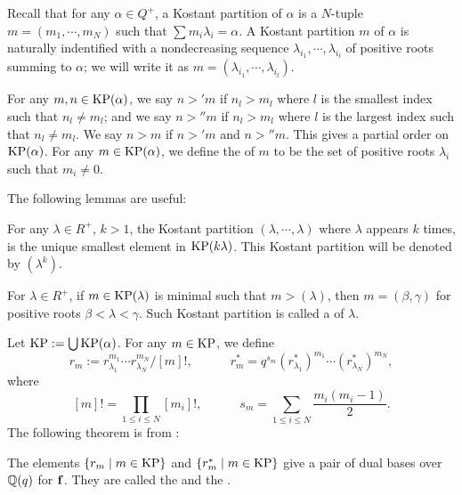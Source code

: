Recall that for any $\alpha\in Q^+$, a Kostant partition of $\alpha$ is a $N$-tuple
$m = (m_1,\cdots,m_N)$ such that $\sum m_i\lambda_i = \alpha$. A Kostant partition $m$
of $\alpha$ is naturally indentified with a nondecreasing sequence
$\lambda_{i_1},\cdots,\lambda_{i_l}$ of positive roots summing to $\alpha$;
we will write it as $m = (\lambda_{i_1},\cdots,\lambda_{i_l})$.

For any $m,n\in\operatorname{KP}(\alpha)$, we say $n>'m$ if $n_l>m_l$ where 
$l$ is the smallest index such that $n_l\ne m_l$; and we say $n>''m$ if $n_l>m_l$ where 
$l$ is the largest index such that $n_l\ne m_l$. We say $n>m$ if
$n>'m$ and $n>''m$. This gives a partial order on $\operatorname{KP}(\alpha)$.
For any $m\in\operatorname{KP}(\alpha)$, we define the  of $m$ to be the 
set of positive roots $\lambda_i$ such that $m_i\ne 0$. 

The following lemmas are useful:

\begin{lemma}\label{minimal-element-in-KP}
    For any $\lambda\in R^+$, $k>1$, the Kostant partition 
    $(\lambda,\cdots,\lambda)$ where $\lambda$ appears $k$ times, is the unique
    smallest element in $\operatorname{KP}(k\lambda)$. This Kostant partition
    will be denoted by $(\lambda^k)$.
\end{lemma}

\begin{lemma}
    For $\lambda\in R^+$, if $m\in\operatorname{KP}(\lambda)$ is minimal such that
    $m>(\lambda)$, then $m = (\beta,\gamma)$ for positive roots
    $\beta<\lambda<\gamma$. Such Kostant partition is called
    a  of $\lambda$.
\end{lemma}

Let $\operatorname{KP} := \bigcup \operatorname{KP}(\alpha)$. For any $m\in\operatorname{KP}$, we define
\[
    r_m := r_{\lambda_1}^{m_1}\cdots r_{\lambda_N}^{m_N}/[m]!,
    \hspace{3em} r_m^* = q^{s_m}(r_{\lambda_1}^*)^{m_1}\cdots(r_{\lambda_N}^*)^{m_N},
\]    
where 
\[
    [m]! = \prod_{1\le i\le N}[m_i]!,\hspace{3em}
    s_m = \sum_{1\le i\le N}\dfrac{m_i(m_i-1)}2.
\]
The following theorem is from \cite{L}:

\begin{theorem}\label{pbw-basis}
    The elements $\{r_m\mid m\in\operatorname{KP}\}$ and $\{r_m^*\mid m\in\operatorname{KP}\}$
    give a pair of dual bases over $\mathbb{Q}(q)$ for $\mathbf{f}$. They are called the  and the 
    .
\end{theorem}

